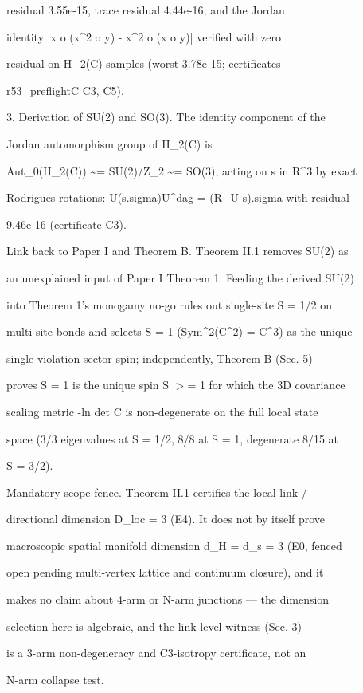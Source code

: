 \documentclass[11pt,a4paper]{article}
\theoremstyle{definition}
\begin{document}
   residual 3.55e-15, trace residual 4.44e-16, and the Jordan

   identity |x o (x\^{}2 o y) - x\^{}2 o (x o y)| verified with zero

   residual on H\_2(C) samples (worst 3.78e-15; certificates

   r53\_preflightC C3, C5).

3. Derivation of SU(2) and SO(3). The identity component of the

   Jordan automorphism group of H\_2(C) is

   Aut\_0(H\_2(C)) \textasciitilde{}= SU(2)/Z\_2 \textasciitilde{}= SO(3), acting on s in R\^{}3 by exact

   Rodrigues rotations: U(s.sigma)U\^{}dag = (R\_U s).sigma with residual

   9.46e-16 (certificate C3).


Link back to Paper I and Theorem B. Theorem II.1 removes SU(2) as

an unexplained input of Paper I Theorem 1. Feeding the derived SU(2)

into Theorem 1's monogamy no-go rules out single-site S = 1/2 on

multi-site bonds and selects S = 1 (Sym\^{}2(C\^{}2) = C\^{}3) as the unique

single-violation-sector spin; independently, Theorem B (Sec. 5)

proves S = 1 is the unique spin S $>$= 1 for which the 3D covariance

scaling metric -ln det C is non-degenerate on the full local state

space (3/3 eigenvalues at S = 1/2, 8/8 at S = 1, degenerate 8/15 at

S = 3/2).


Mandatory scope fence. Theorem II.1 certifies the local link /

directional dimension D\_loc = 3 (E4). It does not by itself prove

macroscopic spatial manifold dimension d\_H = d\_s = 3 (E0, fenced

open pending multi-vertex lattice and continuum closure), and it

makes no claim about 4-arm or N-arm junctions — the dimension

selection here is algebraic, and the link-level witness (Sec. 3)

is a 3-arm non-degeneracy and C3-isotropy certificate, not an

N-arm collapse test.
\end{document}
